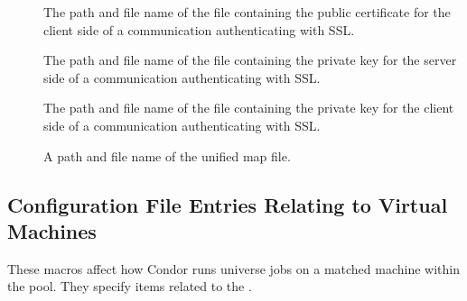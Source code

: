 \begin{description}
\item[]
\label{param:AuthSSLClientCertfile}
The path and file name of
the file containing the public certificate
for the client side of a communication authenticating
with SSL.


\item[]
\label{param:AuthSSLServerKeyfile}
The path and file name of
the file containing the private key
for the server side of a communication authenticating
with SSL.

\item[]
\label{param:AuthSSLClientKeyfile}
The path and file name of
the file containing the private key
for the client side of a communication authenticating
with SSL.


\item[]
\label{param:CertificateMapfile}
A path and file name of the unified map file.

\end{description}

\subsection{\label{sec:Config-VMs}Configuration File Entries
Relating to Virtual Machines}

These macros affect how Condor runs  universe jobs on
a matched machine within the pool.
They specify items related to the .

